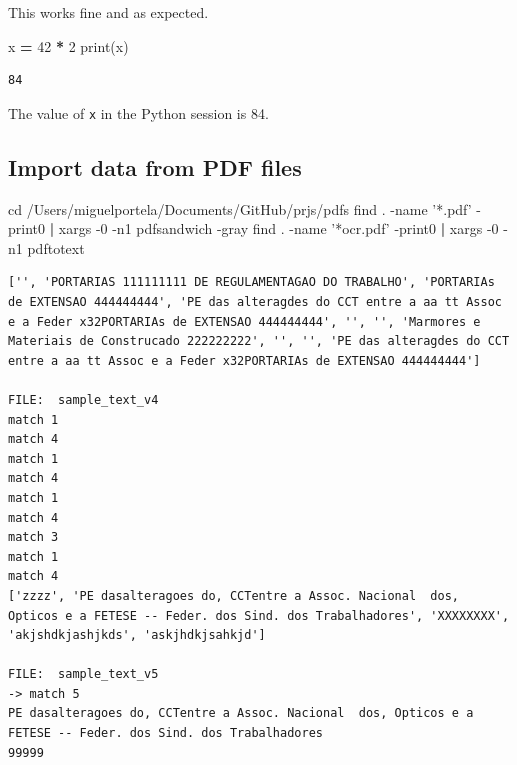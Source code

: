 \documentclass[
  12pt,
]{article}
\newenvironment{Shaded}{\begin{snugshade}}{\end{snugshade}}
\newcommand{\BuiltInTok}[1]{#1}
\newcommand{\DecValTok}[1]{\textcolor[rgb]{0.00,0.00,0.81}{#1}}
\newcommand{\FunctionTok}[1]{\textcolor[rgb]{0.00,0.00,0.00}{#1}}
\newcommand{\KeywordTok}[1]{\textcolor[rgb]{0.13,0.29,0.53}{\textbf{#1}}}
\newcommand{\NormalTok}[1]{#1}
\newcommand{\OperatorTok}[1]{\textcolor[rgb]{0.81,0.36,0.00}{\textbf{#1}}}
\newcommand{\StringTok}[1]{\textcolor[rgb]{0.31,0.60,0.02}{#1}}
\begin{document}
This works fine and as expected.

\begin{Shaded}
\begin{Highlighting}[]
\NormalTok{x }\OperatorTok{=} \DecValTok{42} \OperatorTok{*} \DecValTok{2}
\BuiltInTok{print}\NormalTok{(x) }
\end{Highlighting}
\end{Shaded}

\begin{verbatim}
84
\end{verbatim}

The value of \texttt{x} in the Python session is 84.

\hypertarget{import-data-from-pdf-files}{%
\subsection{Import data from PDF files}\label{import-data-from-pdf-files}}

\begin{Shaded}
\begin{Highlighting}[]
  \BuiltInTok{cd}\NormalTok{ /Users/miguelportela/Documents/GitHub/prjs/pdfs}
    \FunctionTok{find}\NormalTok{ . -name }\StringTok{'*.pdf'}\NormalTok{ -print0 }\KeywordTok{|} \FunctionTok{xargs}\NormalTok{ -0 -n1 pdfsandwich -gray}
    \FunctionTok{find}\NormalTok{ . -name }\StringTok{'*ocr.pdf'}\NormalTok{ -print0 }\KeywordTok{|} \FunctionTok{xargs}\NormalTok{ -0 -n1 pdftotext}
\end{Highlighting}
\end{Shaded}

\begin{verbatim}
['', 'PORTARIAS 111111111 DE REGULAMENTAGAO DO TRABALHO', 'PORTARIAs de EXTENSAO 444444444', 'PE das alteragdes do CCT entre a aa tt Assoc e a Feder x32PORTARIAs de EXTENSAO 444444444', '', '', 'Marmores e Materiais de Construcado 222222222', '', '', 'PE das alteragdes do CCT entre a aa tt Assoc e a Feder x32PORTARIAs de EXTENSAO 444444444']
   
FILE:  sample_text_v4
match 1
match 4
match 1
match 4
match 1
match 4
match 3
match 1
match 4
['zzzz', 'PE dasalteragoes do, CCTentre a Assoc. Nacional  dos, Opticos e a FETESE -- Feder. dos Sind. dos Trabalhadores', 'XXXXXXXX', 'akjshdkjashjkds', 'askjhdkjsahkjd']
   
FILE:  sample_text_v5
-> match 5
PE dasalteragoes do, CCTentre a Assoc. Nacional  dos, Opticos e a FETESE -- Feder. dos Sind. dos Trabalhadores
99999
\end{verbatim}
\end{document}
